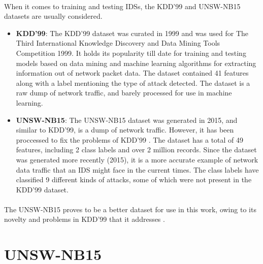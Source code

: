 \paragraph{}
When it comes to training and testing IDSs, the KDD'99 \cite{kdd99} and UNSW-NB15 \cite{unsw15} datasets are usually considered.
\begin{itemize}
    \item \textbf{KDD'99}: The KDD'99 dataset was curated in 1999 and was used for The Third International Knowledge Discovery and Data Mining Tools Competition 1999. It holds its popularity till date for training and testing models based on data mining and machine learning algorithms for extracting information out of network packet data. The dataset contained 41 features along with a label mentioning the type of attack detected. The dataset is a raw dump of network traffic, and barely processed for use in machine learning.
    \item \textbf{UNSW-NB15}: The UNSW-NB15 dataset was generated in 2015, and similar to KDD'99, is a dump of network traffic. However, it has been proccessed to fix the problems of KDD'99 \cite{unsw_comparison}. The dataset has a total of 49 features, including 2 class labels and over 2 million records. Since the dataset was generated more recently (2015), it is a more accurate example of network data traffic that an IDS might face in the current times. The class labels have classified 9 different kinds of attacks, some of which were not present in the KDD'99 dataset.
\end{itemize}

\paragraph{}
The UNSW-NB15 proves to be a better dataset for use in this work, owing to its novelty and problems in KDD'99 that it addresses \cite{unsw_comparison}.

\section{UNSW-NB15}
\label{unsw_details}

